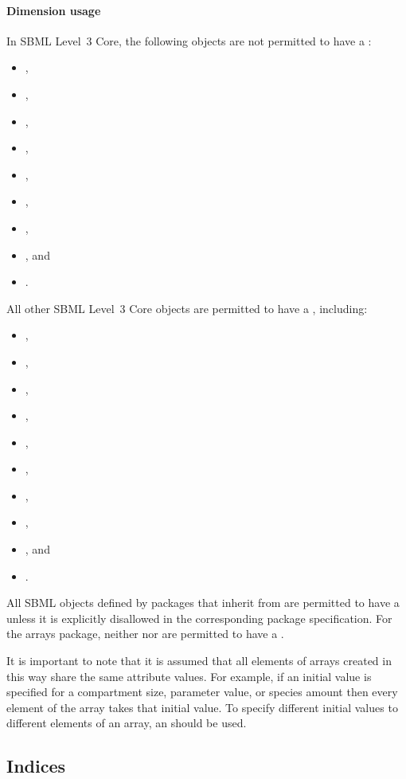 \paragraph{Dimension usage}
\label{sec:dimensionUsage}

In SBML Level~3 Core, the following objects are not permitted to have a \ListOfDimensions:
\begin{itemize}
\item \Model,
\item \FunctionDefinition,  
\item \Unit,  
\item \UnitDefinition,  
\item \KineticLaw,  
\item \LocalParameter,  
\item \Trigger,  
\item \Priority, and 
\item \Delay.
\end{itemize}
All other SBML Level~3 Core objects are permitted to have a \ListOfDimensions, including:
\begin{itemize}
\item \Compartment,
\item \Species,
\item \Parameter,
\item \InitialAssignment,
\item \Rule,
\item \Constraint,
\item \Reaction,
\item \SpeciesReference,
\item \Event, and
\item \EventAssignment.    
\end{itemize}
All SBML objects defined by packages that inherit from \SBase are permitted to have a \ListOfDimensions unless it is explicitly disallowed in the corresponding package specification.   For the arrays package, neither \Dimension nor \Index are permitted to have a \ListOfDimensions.

It is important to note that it is assumed that all elements of arrays created in this way share the same attribute values.   For example, if an initial value is specified for a compartment size, parameter value, or species amount then every element of the array takes that initial value.   To specify different initial values to different elements of an array, an \InitialAssignment should be used.  

\subsection{Indices}
\label{sec:index}

